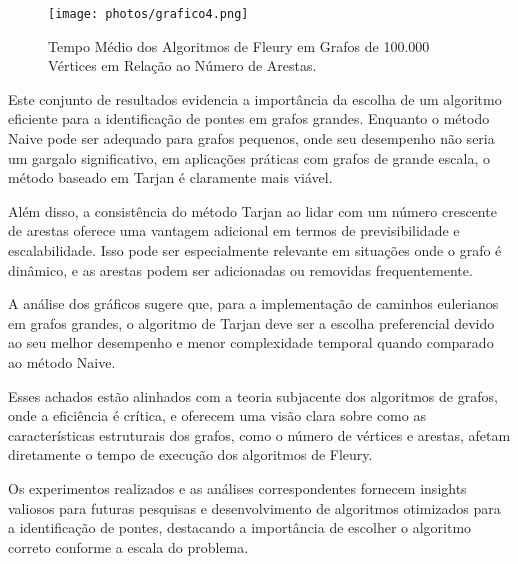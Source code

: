 \documentclass[12pt]{article}
\begin{document}
\begin{figure}[H]
    \centering
    \texttt{[image: photos/grafico4.png]}
    \caption{Tempo Médio dos Algoritmos de Fleury em Grafos de 100.000 Vértices em Relação ao Número de Arestas.}
    \label{fig:grafico4}
\end{figure}

Este conjunto de resultados evidencia a importância da escolha de um algoritmo eficiente para a identificação de pontes em grafos grandes. Enquanto o método Naive pode ser adequado para grafos pequenos, onde seu desempenho não seria um gargalo significativo, em aplicações práticas com grafos de grande escala, o método baseado em Tarjan é claramente mais viável.

Além disso, a consistência do método Tarjan ao lidar com um número crescente de arestas oferece uma vantagem adicional em termos de previsibilidade e escalabilidade. Isso pode ser especialmente relevante em situações onde o grafo é dinâmico, e as arestas podem ser adicionadas ou removidas frequentemente.

A análise dos gráficos sugere que, para a implementação de caminhos eulerianos em grafos grandes, o algoritmo de Tarjan deve ser a escolha preferencial devido ao seu melhor desempenho e menor complexidade temporal quando comparado ao método Naive.

Esses achados estão alinhados com a teoria subjacente dos algoritmos de grafos, onde a eficiência é crítica, e oferecem uma visão clara sobre como as características estruturais dos grafos, como o número de vértices e arestas, afetam diretamente o tempo de execução dos algoritmos de Fleury.

Os experimentos realizados e as análises correspondentes fornecem insights valiosos para futuras pesquisas e desenvolvimento de algoritmos otimizados para a identificação de pontes, destacando a importância de escolher o algoritmo correto conforme a escala do problema.






\end{document}
